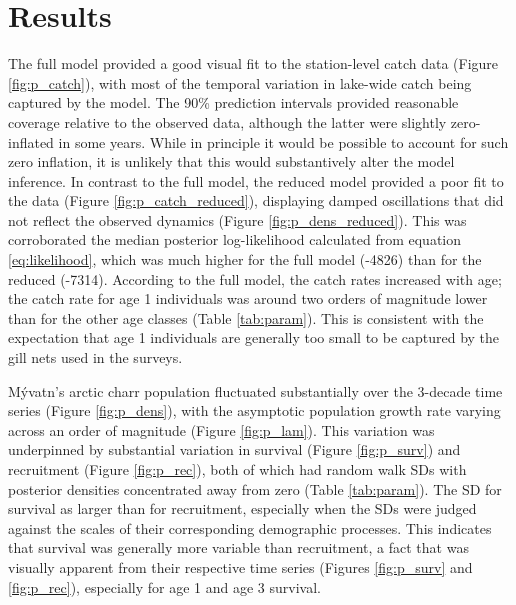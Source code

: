 \section*{Results}

The full model provided a good visual fit to the station-level 
catch data (Figure \ref{fig:p_catch}),
with most of the temporal variation in lake-wide catch being captured by the model.
The 90\% prediction intervals provided reasonable coverage relative to the observed data,
although the latter were slightly zero-inflated in some years.
While in principle it would be possible to account for such zero inflation,
it is unlikely that this would substantively alter the model inference.
In contrast to the full model,
the reduced model provided a poor fit to the data (Figure \ref{fig:p_catch_reduced}),
displaying damped oscillations that did not reflect the observed dynamics
(Figure \ref{fig:p_dens_reduced}).
This was corroborated the median posterior log-likelihood calculated
from equation \ref{eq:likelihood},
which was much higher for the full model (-4826) than for the reduced (-7314).
According to the full model, 
the catch rates increased with age;
the catch rate for age 1 individuals was around two orders of magnitude lower
than for the other age classes (Table \ref{tab:param}). 
This is consistent with the expectation that age 1 individuals 
are generally too small to be captured by the gill nets used in the surveys.

M\'{y}vatn's arctic charr population fluctuated substantially over the 3-decade time series
(Figure \ref{fig:p_dens}), 
with the asymptotic population growth rate varying across an order of magnitude 
(Figure \ref{fig:p_lam}).
This variation was underpinned by substantial variation in survival 
(Figure \ref{fig:p_surv}) 
and recruitment (Figure \ref{fig:p_rec}),
both of which had random walk SDs 
with posterior densities concentrated away from zero (Table \ref{tab:param}).
The SD for survival as larger than for recruitment,
especially when the SDs were judged against the scales of their corresponding 
demographic processes. 
This indicates that survival was generally more variable than recruitment,
a fact that was visually apparent from their respective time series
(Figures \ref{fig:p_surv} and \ref{fig:p_rec}),
especially for age 1 and age 3 survival.

